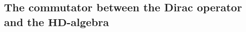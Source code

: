 \documentclass[letterpaper,11pt]{article}
\newcommand{\cF}{{\cal F}}
\begin{document}







\subsection{The commutator between the Dirac operator and the $\mathbf{HD}$-algebra }
\end{document}
